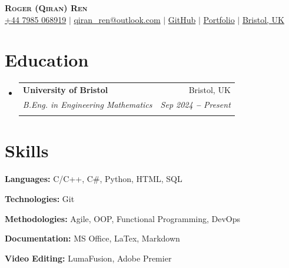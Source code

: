 \documentclass[letterpaper,11pt]{article}
\makeatletter
\newcommand{\resumeEducationHeading}[6]{
  \vspace{-2pt}\item
    \begin{tabular*}{0.97\textwidth}[t]{l@{\extracolsep{\fill}}r}
      \textbf{#1} & #2 \\
      \textit{\small#3} & \textit{\small #4} \\
      \textit{\small#5} & \textit{\small #6} \\
    \end{tabular*}\vspace{-5pt}
}
\newcommand{\resumeSubHeadingListStart}{\begin{itemize}[leftmargin=0.15in, label={}]}
\newcommand{\resumeSubHeadingListEnd}{\end{itemize}}
\makeatother
\begin{document}

\begin{center}
    \textbf{\Huge \scshape Roger (Qiran) Ren} \\ \vspace{3pt}
    \small
    \faMobile \hspace{.5pt} \href{tel:447985068919}{+44 7985 068919}
    $|$
    \faAt \hspace{.5pt} \href{mailto:qiran_ren@outlook.com}{qiran\_ren@outlook.com}
    $|$
    \faGithub \hspace{.5pt} \href{https://github.com/Lucario-RR}{GitHub}
    $|$
    \faGlobe \hspace{.5pt} \href{https://github.com/Lucario-RR/Roger-CV}{Portfolio}
    $|$
    \faMapMarker \hspace{.5pt} \href{https://www.google.co.uk/maps?q=Bristol,+Bristol}{Bristol, UK}
\end{center}




\section{Education}
  \vspace{3pt}
    \resumeSubHeadingListStart
    
    \resumeEducationHeading
      {University of Bristol}{Bristol, UK}
      {B.Eng. in Engineering Mathematics}{Sep 2024 \textbf{--} Present}{}{}
    
    \resumeSubHeadingListEnd




\section{Skills}
  \vspace{2pt}
  \resumeSubHeadingListStart
    \small{\item{
    
        \textbf{Languages:}{ C/C++, C\#, Python, HTML, SQL} \\ \vspace{3pt}
        
        \textbf{Technologies:}{ Git} \\ \vspace{3pt}
        
        \textbf{Methodologies:}{ Agile, OOP, Functional Programming, DevOps} \\ \vspace{3pt}

        \textbf{Documentation:}{ MS Office, LaTex, Markdown}

        \textbf{Video Editing:}{ LumaFusion, Adobe Premier}
        
    }}
  \resumeSubHeadingListEnd
\end{document}
